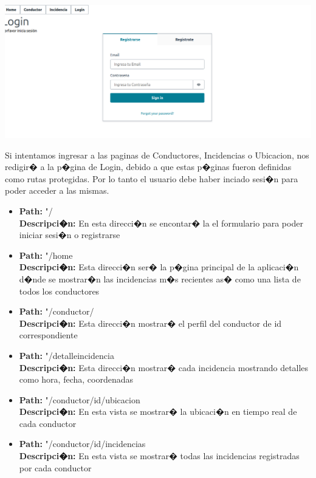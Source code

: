 \documentclass[12pt,letterpaper]{article}
\begin{document}
\begin{center}
  \includegraphics[scale=0.4]{imagenes/loginpage}
 \label{fig:loginpage} 
\end{center} 

Si intentamos ingresar a las paginas de Conductores, Incidencias o Ubicacion, nos redigir� a la p�gina de Login, debido a que estas p�ginas fueron definidas como rutas protegidas. Por lo tanto el usuario debe haber inciado sesi�n para poder acceder a las mismas.


\begin{itemize}
\item \textbf{Path:} "/\\ \textbf{Descripci�n:} En esta direcci�n se encontar� la el formulario para poder iniciar sesi�n o registrarse

\item \textbf{Path:} "/home \\  \textbf{Descripci�n:} Esta direcci�n ser� la p�gina principal de la aplicaci�n d�nde se mostrar�n las incidencias m�s recientes as� como una lista de todos los conductores

\item \textbf{Path:} "/conductor/\\ \textbf{Descripci�n:} Esta direcci�n mostrar� el perfil del conductor de id correspondiente

\item \textbf{Path:} "/detalle\textunderscore incidencia \\ \textbf{Descripci�n:} Esta direcci�n mostrar� cada incidencia mostrando detalles como hora, fecha, coordenadas

\item \textbf{Path:}  "/conductor/id/ubicacion \\ \textbf{Descripci�n:} En esta vista se mostrar� la ubicaci�n en tiempo real de cada conductor


\item \textbf{Path:} "/conductor/id/incidencias \\ \textbf{Descripci�n:} En esta vista se mostrar� todas las incidencias registradas por cada conductor

\end{itemize}
\end{document}
